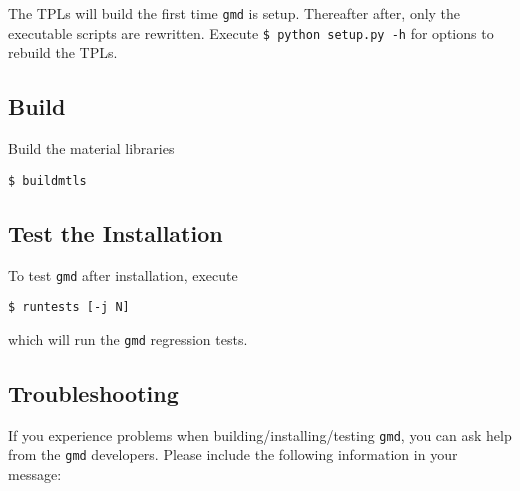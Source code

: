 \documentclass[11pt]{report}
\newcommand{\gmd}{\texttt{gmd}}
\begin{document}
The TPLs will build the first time \gmd{} is setup.
Thereafter after, only the executable scripts are rewritten.  Execute
\verb:$ python setup.py -h: for options to rebuild the TPLs.

\subsection{Build}
Build the material libraries
\begin{verbatim}
$ buildmtls
\end{verbatim}

\subsection{Test the Installation}
To test \gmd{} after installation, execute

\begin{verbatim}
$ runtests [-j N]
\end{verbatim}
%
which will run the \gmd{} regression tests.

\subsection{Troubleshooting}
If you experience problems when building/installing/testing \gmd{}, you can
ask help from the \gmd{} developers. Please include the following information
in your message:
\end{document}
